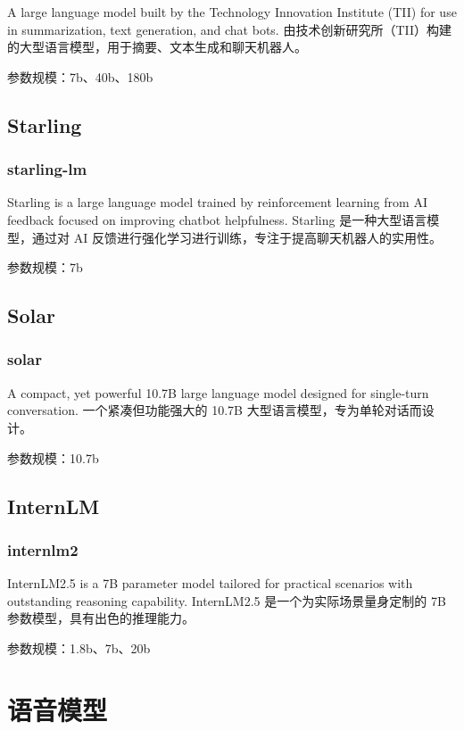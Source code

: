 \documentclass[12pt,UTF8]{ctexbook}
\begin{document}
A large language model built by the Technology Innovation Institute (TII) for use in summarization, text generation, and chat bots.
由技术创新研究所（TII）构建的大型语言模型，用于摘要、文本生成和聊天机器人。

参数规模：7b、40b、180b

\section{Starling}

\subsection{starling-lm}

Starling is a large language model trained by reinforcement learning from AI feedback focused on improving chatbot helpfulness.
Starling 是一种大型语言模型，通过对 AI 反馈进行强化学习进行训练，专注于提高聊天机器人的实用性。

参数规模：7b

\section{Solar}

\subsection{solar}

A compact, yet powerful 10.7B large language model designed for single-turn conversation.
一个紧凑但功能强大的 10.7B 大型语言模型，专为单轮对话而设计。

参数规模：10.7b

\section{InternLM}

\subsection{internlm2}

InternLM2.5 is a 7B parameter model tailored for practical scenarios with outstanding reasoning capability.
InternLM2.5 是一个为实际场景量身定制的 7B 参数模型，具有出色的推理能力。

参数规模：1.8b、7b、20b

\chapter{语音模型}
\end{document}
